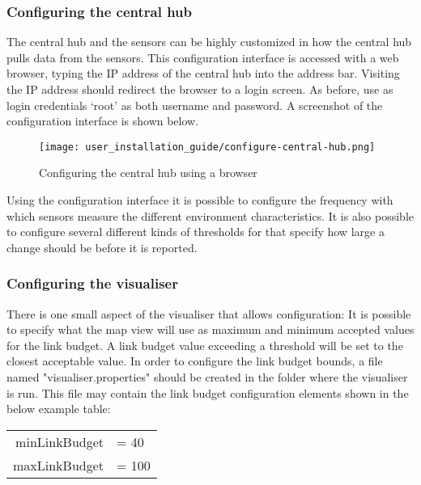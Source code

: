 \documentclass[../document.tex]{subfiles}
\begin{document}
\subsubsection{Configuring the central hub}
The central hub and the sensors can be highly customized in how the central hub pulls data from the sensors. This configuration interface is accessed with a web browser, typing the IP address of the central hub into the address bar. Visiting the IP address should redirect the browser to a login screen. As before, use as login credentials ‘root’ as both username and password. A screenshot of the configuration interface is shown below.
\begin{figure}[H]\caption{Configuring the central hub using a browser}
	\centering
	\texttt{[image: user\_installation\_guide/configure-central-hub.png]}
\end{figure}

Using the configuration interface it is possible to configure the frequency with which sensors measure the different environment characteristics. It is also possible to configure several different kinds of thresholds for that specify how large a change should be before it is reported.


\subsubsection{Configuring the visualiser}
There is one small aspect of the visualiser that allows configuration: It is possible to specify what the map view will use as maximum and minimum accepted values for the link budget. A link budget value exceeding a threshold will be set to the closest acceptable value. In order to configure the link budget bounds, a file named "visualiser.properties" should be created in the folder where the visualiser is run. This file may contain the link budget configuration elements shown in the below example table:
\begin{table}[H]
	\centering
	\ttfamily
	\begin{tabular}{|rl|}\hline
		minLinkBudget &= 40	\\
		maxLinkBudget &= 100	\\\hline
	\end{tabular}
\end{table}
\end{document}
